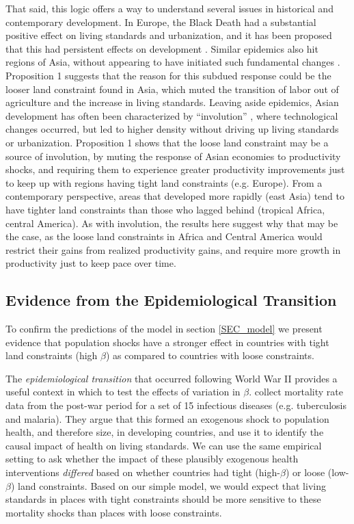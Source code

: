 \documentclass[11pt]{article}
\begin{document}
That said, this logic offers a way to understand several issues in historical and contemporary development. In Europe, the Black Death had a substantial positive effect on living standards and urbanization, and it has been proposed that this had persistent effects on development \citep{vv08,vv13}. Similar epidemics also hit regions of Asia, without appearing to have initiated such fundamental changes \citep{McNeill1976}. Proposition 1 suggests that the reason for this subdued response could be the looser land constraint found in Asia, which muted the transition of labor out of agriculture and the increase in living standards. Leaving aside epidemics, Asian development has often been characterized by ``involution'' \citep{Geertz1963,Huang1990,huang2002}, where technological changes occurred, but led to higher density without driving up living standards or urbanization. Proposition 1 shows that the loose land constraint may be a source of involution, by muting the response of Asian economies to productivity shocks, and requiring them to experience greater productivity improvements just to keep up with regions having tight land constraints (e.g. Europe). From a contemporary perspective, areas that developed more rapidly (east Asia) tend to have tighter land constraints than those who lagged behind (tropical Africa, central America). As with involution, the results here suggest why that may be the case, as the loose land constraints in Africa and Central America would restrict their gains from realized productivity gains, and require more growth in productivity just to keep pace over time. 

\subsection{Evidence from the Epidemiological Transition}\label{SEC_ajtest}
To confirm the predictions of the model in section \ref{SEC_model} we present evidence that population shocks have a stronger effect in countries with tight land constraints (high $\beta$) as compared to countries with loose constraints.

The \textit{epidemiological transition} that occurred following World War II provides a useful context in which to test the effects of variation in $\beta$. \cite{aj07} collect mortality rate data from the post-war period for a set of 15 infectious diseases (e.g. tuberculosis and malaria). They argue that this formed an exogenous shock to population health, and therefore size, in developing countries, and use it to identify the causal impact of health on living standards. We can use the same empirical setting to ask whether the impact of these plausibly exogenous health interventions \textit{differed} based on whether countries had tight (high-$\beta$) or loose (low-$\beta$) land constraints. Based on our simple model, we would expect that living standards in places with tight constraints should be more sensitive to these mortality shocks than places with loose constraints.
\end{document}
